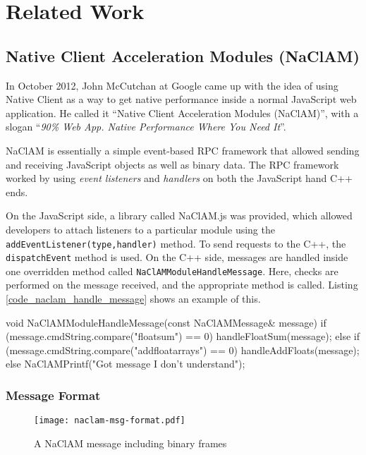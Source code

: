 \chapter{Related Work} 
\label{Chapter3} 

\section{Native Client Acceleration Modules (NaClAM)} %
\label{sec:naclam}

In October 2012, John McCutchan at Google came up with the idea of using Native Client as a way to get native performance inside a normal JavaScript web application. He called it ``Native Client Acceleration Modules (NaClAM)'', with a slogan ``\emph{90\% Web App. Native Performance Where You Need It}''.

NaClAM is essentially a simple event-based RPC framework that allowed sending and receiving JavaScript objects as well as binary data. The RPC framework worked by using \emph{event listeners} and \emph{handlers} on both the JavaScript hand C++ ends. 

On the JavaScript side, a library called NaClAM.js was provided, which allowed developers to attach listeners to a particular module using the \lstinline{addEventListener(type,handler)} method. To send requests to the C++, the \lstinline{dispatchEvent} method is used. On the C++ side, messages are handled inside one overridden method called \lstinline{NaClAMModuleHandleMessage}. Here, checks are performed on the message received, and the appropriate method is called. Listing \ref{code_naclam_handle_message} shows an example of this. 

\begin{code}
void NaClAMModuleHandleMessage(const NaClAMMessage& message) {
  if (message.cmdString.compare("floatsum") == 0) {
    handleFloatSum(message);
  } else if (message.cmdString.compare("addfloatarrays") == 0) {
    handleAddFloats(message);
  } else {
    NaClAMPrintf("Got message I don't understand");
  }
}
\end{code}

\subsection{Message Format} %
\label{sub:naclam_message_format}
\begin{figure}
	\centering
	\texttt{[image: naclam-msg-format.pdf]} 
	\caption{A NaClAM message including binary frames}
	\label{fig:naclam_msg_format}
\end{figure}

